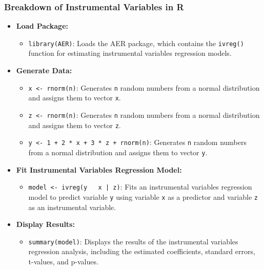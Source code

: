 \documentclass[serif, 9pt, aspectratio=32]{beamer}
\begin{document}
\begin{frame}
    \frametitle{Breakdown of Instrumental Variables in R}
    \begin{itemize}
        \setlength{\itemsep}{2em}
        \item \textbf{Load Package:}
              \begin{itemize}
                  \item \texttt{library(AER)}: Loads the AER package, which contains the \texttt{ivreg()} function for estimating instrumental variables regression models.
              \end{itemize}

        \item \textbf{Generate Data:}
              \begin{itemize}
                  \item \texttt{x <- rnorm(n)}: Generates \texttt{n} random numbers from a normal distribution and assigns them to vector \texttt{x}.
                  \item \texttt{z <- rnorm(n)}: Generates \texttt{n} random numbers from a normal distribution and assigns them to vector \texttt{z}.
                  \item \texttt{y <- 1 + 2 * x + 3 * z + rnorm(n)}: Generates \texttt{n} random numbers from a normal distribution and assigns them to vector \texttt{y}.
              \end{itemize}

        \item \textbf{Fit Instrumental Variables Regression Model:}
              \begin{itemize}
                  \item \texttt{model <- ivreg(y ~ x | z)}: Fits an instrumental variables regression model to predict variable \texttt{y} using variable \texttt{x} as a predictor and variable \texttt{z} as an instrumental variable.
              \end{itemize}

        \item \textbf{Display Results:}
              \begin{itemize}
                  \item \texttt{summary(model)}: Displays the results of the instrumental variables regression analysis, including the estimated coefficients, standard errors, t-values, and p-values.
              \end{itemize}
    \end{itemize}
\end{frame}
\end{document}
